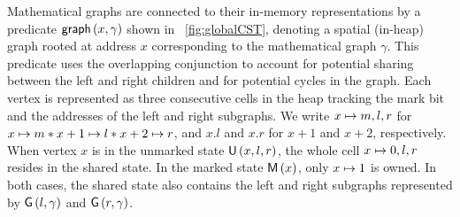 Mathematical graphs are connected to their in-memory representations
by a predicate $\textsf{graph}\left(x, \gamma\right)$ shown in \fig~\ref{fig:globalCST}, denoting a spatial
(in-heap) graph rooted at address $x$ corresponding to the
mathematical graph $\gamma$. This predicate uses the overlapping conjunction to account
for potential sharing between the left and right children and for potential
cycles in the graph.
%
Each vertex is represented as three consecutive cells in the heap
tracking the mark bit and the addresses of the left and right
subgraphs. We write $x \mapsto m, l, r$ for $x \mapsto m *
x+1 \mapsto l * x+2 \mapsto r$, and $x.l$ and $x.r$ for $x+1$ and
$x+2$, respectively. When vertex $x$ is in the unmarked state
$\textsf{U}\left(x, l, r\right)$, the whole cell $x \mapsto 0,l,r$ resides in the
shared state. In the marked state $\textsf{M}\left(x\right)$, only $x \mapsto 1$ is
owned. In both cases, the shared state also contains the left and
right subgraphs represented by $\textsf{G}\left(l, \gamma\right)$ and $\textsf{G}\left(r, \gamma\right)$.

